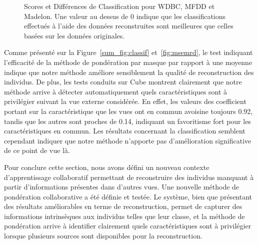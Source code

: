 \begin{figure}[h]
    \quad
    \caption{Scores et Différences de Classification pour WDBC, MFDD et Madelon. Une valeur au dessus de 0 indique que les classifications effectués à l'aide des données reconstruites sont meilleures que celles basées sur les données originales.}
\end{figure}

Comme présenté sur la Figure~\ref{sum_fig:classif} et~\ref{fig:msemrd}, le test indiquant l'efficacité de la méthode de pondération par masque par rapport à une moyenne indique que notre méthode améliore sensiblement la qualité de reconstruction des individus. De plus, les tests conduits sur Cube montrent clairement que notre méthode arrive à détecter automatiquement quels caractéristiques sont à privilégier suivant la vue externe considérée. En effet, les valeurs des coefficient portant sur la caractéristique que les vues ont en commun avoisine toujours 0.92, tandis que les autres sont proches de 0.14, indiquant un favoritisme fort pour les caractéristiques en commun. Les résultats concernant la classification semblent cependant indiquer que notre méthode n'apporte pas d'amélioration significative de ce point de vue là.

Pour conclure cette section, nous avons défini un nouveau contexte d'apprentissage collaboratif permettant de reconstruire des individus manquant à partir d'informations présentes dans d'autres vues. Une nouvelle méthode de pondération collaborative a été définie et testée. Le système, bien que présentant des résultats améliorables en terme de reconstruction, permet de capturer des informations intrinsèques aux individus telles que leur classe, et la méthode de pondération arrive à identifier clairement quels caractéristiques sont à privilégier lorsque plusieurs sources sont disponibles pour la reconstruction.

